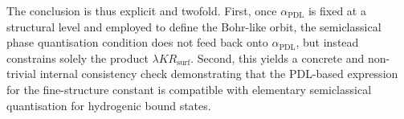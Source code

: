 \documentclass[11pt,a4paper]{article}
\begin{document}
The conclusion is thus explicit and twofold. First, once \(\alpha_{\mathrm{PDL}}\) is fixed at a structural level and employed to define the Bohr-like orbit, the semiclassical phase quantisation condition does not feed back onto \(\alpha_{\mathrm{PDL}}\), but instead constrains solely the product \(\lambda K R_{\mathrm{surf}}\). Second, this yields a concrete and non-trivial internal consistency check demonstrating that the PDL-based expression for the fine-structure constant is compatible with elementary semiclassical quantisation for hydrogenic bound states.



\end{document}
